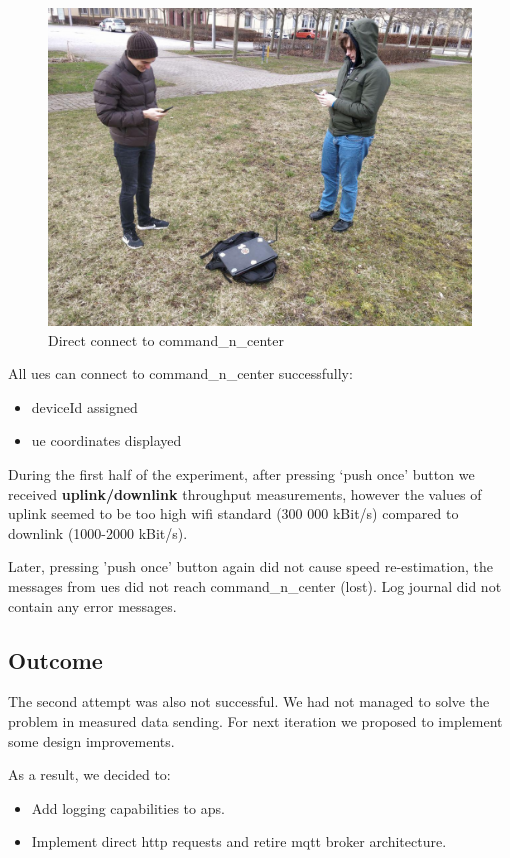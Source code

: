 \begin{figure}[H]
	\centering
	\includegraphics[width=\linewidth,keepaspectratio]{images/experiment_2_overview.jpg}
\caption{Direct connect to \gls{command_n_center}}
\label{fig:attempt-2-direct-cnc-connection}
\end{figure}

All \glspl{ue} can connect to \gls{command_n_center} successfully:

\begin{itemize}
\tightlist
\item
  deviceId assigned
\item
  \gls{ue} coordinates displayed
\end{itemize}

During the first half of the experiment, after pressing `push once' button we received \textbf{uplink/downlink} throughput measurements, however the values of uplink seemed to be too high \gls{wifi} standard (300 000 kBit/s) compared to downlink (1000-2000 kBit/s).

Later, pressing 'push once' button again did not cause speed re-estimation, the messages from \glspl{ue} did not reach \gls{command_n_center} (lost). Log journal did not contain any error messages. 

\subsection{Outcome}

The second attempt was also not successful. We had not managed to solve the problem in measured data sending. For next iteration we proposed to implement some design improvements.

As a result, we decided to:

\begin{itemize}
\tightlist
\item
  Add logging capabilities to \glspl{ap}.
\item
  Implement direct \gls{http} requests and retire \gls{mqtt} broker architecture.
\end{itemize}
